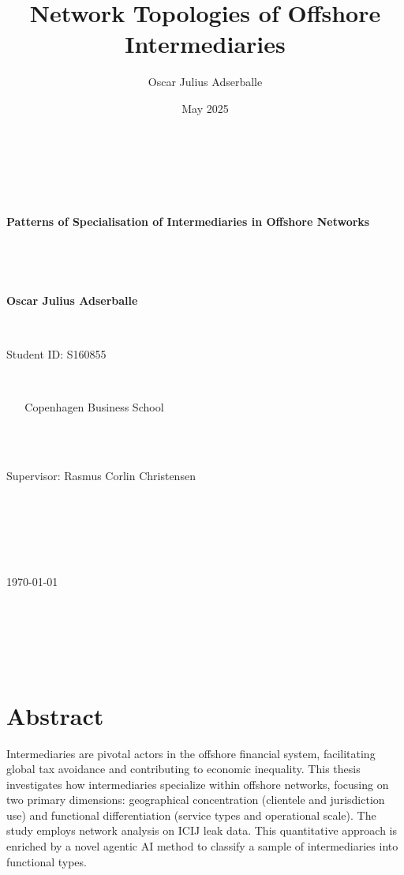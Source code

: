 \documentclass[12pt, a4paper]{report}
\title{Network Topologies of Offshore Intermediaries}
\author{Oscar Julius Adserballe}
\date{May 2025}
\begin{document}
\begin{titlepage}
    \centering
    \vspace*{1cm} 

    {\Huge\bfseries Patterns of Specialisation of Intermediaries in Offshore Networks\par}

    \vspace{1.5cm}

    {\Large\bfseries Oscar Julius Adserballe\par} 
    {\large Student ID: S160855\par} 

    \vspace{1cm}

    {\large Copenhagen Business School} \\ %

    \vspace{2cm}

    {\large Supervisor: Rasmus Corlin Christensen\par} 

    \vspace{1.5cm}

    {\large \today\par} 

    \vfill 
\end{titlepage}

\pagestyle{plain} %

\newpage
\tableofcontents %

\newpage
\listoffigures %

\newpage
\listoftables  %

\newpage

\chapter*{Abstract}
\label{sec:abstract}
Intermediaries are pivotal actors in the offshore financial system, facilitating global tax avoidance and contributing to economic inequality. This thesis investigates how intermediaries specialize within offshore networks, focusing on two primary dimensions: geographical concentration (clientele and jurisdiction use) and functional differentiation (service types and operational scale). The study employs network analysis on ICIJ leak data. This quantitative approach is enriched by a novel agentic AI method to classify a sample of intermediaries into functional types.
\end{document}
